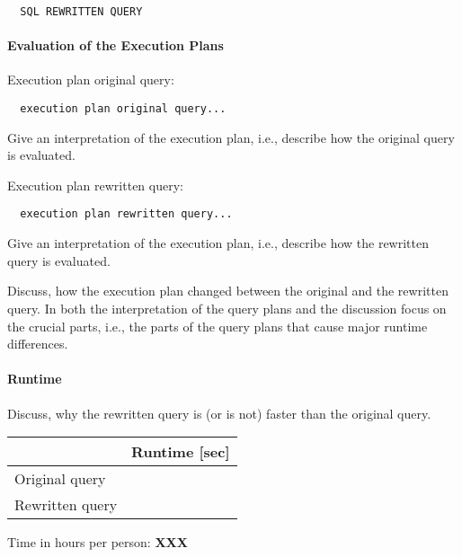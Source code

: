 \documentclass[11pt]{scrartcl}
\begin{document}
{\small
\begin{verbatim}
  SQL REWRITTEN QUERY
\end{verbatim}
}

\paragraph{Evaluation of the Execution Plans}

Execution plan original query:

\begin{verbatim}
  execution plan original query...
\end{verbatim}

Give an interpretation of the execution plan, i.e., describe how the
original query is evaluated.

Execution plan rewritten query:

\begin{verbatim}
  execution plan rewritten query...
\end{verbatim}

Give an interpretation of the execution plan, i.e., describe how the
rewritten query is evaluated.

Discuss, how the execution plan changed between the original and the
rewritten query. In both the interpretation of the query plans and the
discussion focus on the crucial parts, i.e., the parts of the query
plans that cause major runtime differences.

\paragraph{Runtime} Discuss, why the rewritten query is (or is not)
faster than the original query.


\begin{table}[H]
  \begin{tabular}{l|r}
    & Runtime [sec] \\
   \hline
    Original query & \\
    Rewritten query & \\
  \end{tabular}
\end{table}


  Time in hours per person: {\bf XXX}
\end{document}
